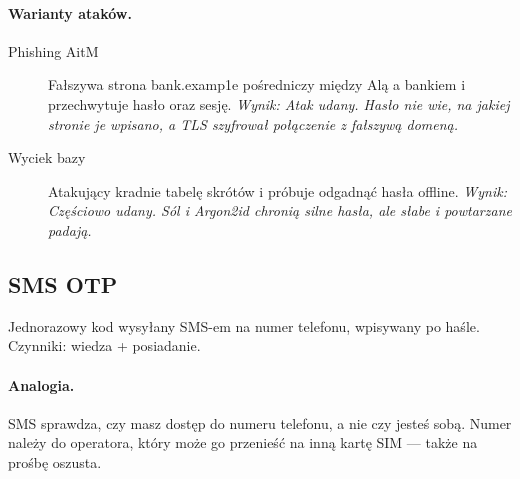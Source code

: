 \paragraph{Warianty ataków.}
\begin{description}
\item[Phishing AitM] Fałszywa strona bank.examp1e pośredniczy między Alą a bankiem i przechwytuje hasło oraz sesję. \emph{Wynik: Atak udany. Hasło nie wie, na jakiej stronie je wpisano, a TLS szyfrował połączenie z fałszywą domeną.}
\item[Wyciek bazy] Atakujący kradnie tabelę skrótów i próbuje odgadnąć hasła offline. \emph{Wynik: Częściowo udany. Sól i Argon2id chronią silne hasła, ale słabe i powtarzane padają.}
\end{description}

\subsection{SMS OTP}
\label{sec:mech-sms}
Jednorazowy kod wysyłany SMS-em na numer telefonu, wpisywany po haśle. Czynniki: wiedza + posiadanie. \cite{N1,A3,X2,X8,A1,P7,P8,N4}

\paragraph{Analogia.} SMS sprawdza, czy masz dostęp do numeru telefonu, a nie czy jesteś sobą. Numer należy do operatora, który może go przenieść na inną kartę SIM — także na prośbę oszusta.

